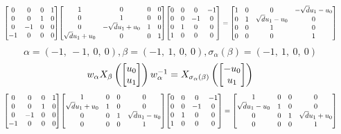 \documentclass[11pt]{article}
\theoremstyle{definition}
\begin{document}
\[
\scaletoalign{\textwidth}{{\left[\begin{matrix}0 & 0 & 0 & 1\\0 & 0 & 1 & 0\\0 & -1 & 0 & 0\\-1 & 0 & 0 & 0\end{matrix}\right]} {\left[\begin{matrix}1 & 0 & 0 & 0\\0 & 1 & 0 & 0\\0 & - \sqrt{d} u_{1} + u_{0} & 1 & 0\\\sqrt{d} u_{1} + u_{0} & 0 & 0 & 1\end{matrix}\right]} {\left[\begin{matrix}0 & 0 & 0 & -1\\0 & 0 & -1 & 0\\0 & 1 & 0 & 0\\1 & 0 & 0 & 0\end{matrix}\right]} = {\left[\begin{matrix}1 & 0 & 0 & - \sqrt{d} u_{1} - u_{0}\\0 & 1 & \sqrt{d} u_{1} - u_{0} & 0\\0 & 0 & 1 & 0\\0 & 0 & 0 & 1\end{matrix}\right]}}
\]
\[
\alpha = \left( -1, \  -1, \  0, \  0\right), \beta = \left( -1, \  1, \  0, \  0\right), \sigma_{\alpha}(\beta) = \left( -1, \  1, \  0, \  0\right)
\]
\[
\scaletoalign{\textwidth}{w_{\alpha} X_{\beta}\left(\left[\begin{matrix}u_{0}\\u_{1}\end{matrix}\right]\right) w_{\alpha}^{-1} = X_{\sigma_{\alpha}\left(\beta\right)}\left(\left[\begin{matrix}- u_{0}\\u_{1}\end{matrix}\right]\right)}
\]
\[
\scaletoalign{\textwidth}{{\left[\begin{matrix}0 & 0 & 0 & 1\\0 & 0 & 1 & 0\\0 & -1 & 0 & 0\\-1 & 0 & 0 & 0\end{matrix}\right]} {\left[\begin{matrix}1 & 0 & 0 & 0\\\sqrt{d} u_{1} + u_{0} & 1 & 0 & 0\\0 & 0 & 1 & \sqrt{d} u_{1} - u_{0}\\0 & 0 & 0 & 1\end{matrix}\right]} {\left[\begin{matrix}0 & 0 & 0 & -1\\0 & 0 & -1 & 0\\0 & 1 & 0 & 0\\1 & 0 & 0 & 0\end{matrix}\right]} = {\left[\begin{matrix}1 & 0 & 0 & 0\\\sqrt{d} u_{1} - u_{0} & 1 & 0 & 0\\0 & 0 & 1 & \sqrt{d} u_{1} + u_{0}\\0 & 0 & 0 & 1\end{matrix}\right]}}
\]
\end{document}
